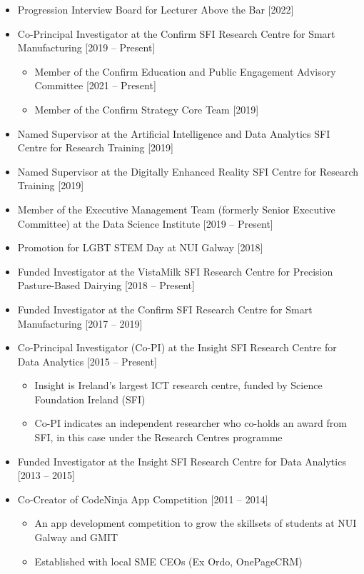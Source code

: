 \documentclass[10pt,a4paper]{res} %
\begin{document}
\begin{resume}
\begin{itemize} \itemsep -2pt
\item Progression Interview Board for Lecturer Above the Bar [2022]
\item Co-Principal Investigator at the Confirm SFI Research Centre for Smart Manufacturing [2019 -- Present]
\begin{itemize} \itemsep -2pt
\item Member of the Confirm Education and Public Engagement Advisory Committee [2021 -- Present]
\item Member of the Confirm Strategy Core Team [2019]
\end{itemize}
\item Named Supervisor at the Artificial Intelligence and Data Analytics SFI Centre for Research Training [2019]
\item Named Supervisor at the Digitally Enhanced Reality SFI Centre for Research Training [2019]
\item Member of the Executive Management Team (formerly Senior Executive Committee) at the Data Science Institute [2019 -- Present]
\item Promotion for LGBT STEM Day at NUI Galway [2018]
\item Funded Investigator at the VistaMilk SFI Research Centre for Precision Pasture-Based Dairying [2018 -- Present]
\item Funded Investigator at the Confirm SFI Research Centre for Smart Manufacturing [2017 -- 2019]
\item Co-Principal Investigator (Co-PI) at the Insight SFI Research Centre for Data Analytics [2015 -- Present]
\begin{itemize} \itemsep -2pt
\item Insight is Ireland's largest ICT research centre, funded by Science Foundation Ireland (SFI)
\item Co-PI indicates an independent researcher who co-holds an award from SFI, in this case under the Research Centres programme
\end{itemize}
\item Funded Investigator at the Insight SFI Research Centre for Data Analytics [2013 -- 2015]
\item Co-Creator of CodeNinja App Competition [2011 -- 2014]
\begin{itemize} \itemsep -2pt
\item An app development competition to grow the skillsets of students at NUI Galway and GMIT
\item Established with local SME CEOs (Ex Ordo, OnePageCRM)

\end{itemize}
\end{itemize}
\end{resume}
\end{document}
